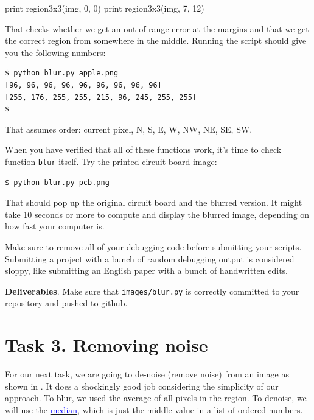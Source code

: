 \begin{pyverbatim}
print region3x3(img, 0, 0)
print region3x3(img, 7, 12)
\end{pyverbatim}

\noindent That checks whether we get an out of range error at the margins and that we get the correct region from somewhere in the middle. Running the script should give you the following numbers:

\begin{lstlisting}[style=BashInputStyle]
$ python blur.py apple.png
[96, 96, 96, 96, 96, 96, 96, 96, 96]
[255, 176, 255, 255, 215, 96, 245, 255, 255]
$ 
\end{lstlisting}

\noindent That assumes order: current pixel, N, S, E, W, NW, NE, SE, SW.

When you have verified that all of these functions work, it's time to check function {\tt blur} itself. Try the printed circuit board image:

\begin{lstlisting}[style=BashInputStyle]
$ python blur.py pcb.png 
\end{lstlisting}

\noindent That should pop up the original circuit board and the blurred version. It might take 10 seconds or more to compute and display the blurred image, depending on how fast your computer is.

\begin{callout}{\bctakecare}
Make sure to remove all of your debugging code before submitting your scripts. Submitting a project with a bunch of random debugging output is considered sloppy, like submitting an English paper with a bunch of handwritten edits.
\end{callout}

\begin{callout}{\bcplume}
{\bf Deliverables}. Make sure that {\tt images/blur.py} is correctly committed to your repository and pushed to github.
\end{callout}

\section{Task 3. Removing noise}

For our next task, we are going to de-noise (remove noise) from an image as shown in . It does a shockingly good job considering the simplicity of our approach. To blur, we used the average of all pixels in the region. To denoise, we will use the \href{http://en.wikipedia.org/wiki/Median}{\textcolor{blue}{median}}, which is just the middle value in a list of ordered numbers.


